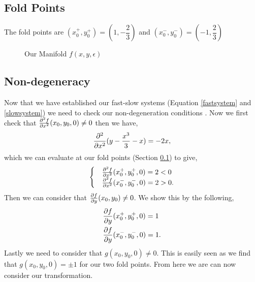 \subsection{Fold Points}\label{Fold Points}
The fold points are $(x_0^+,y_0^+)=(1,-\dfrac{2}{3})$ and $(x_0^-,y_0^-)=(-1,\dfrac{2}{3})$
\begin{figure}[h]
    \centering
    \caption{Our Manifold $f(x,y,\epsilon)$}
    \label{fig:my_label}
\end{figure}

\subsection{Non-degeneracy}
Now that we have established our fast-slow systems (Equation \ref{fastsystem} and \ref{slowsystem}) we need to check our non-degeneration conditions \citep{krupa2001}. 
Now we first check that $ \pd{^2f}{x^2}(x_0,y_0,0)\neq 0$ then we have,
\begin{equation}
    \pd{^2}{x^2}(y-\dfrac{x^3}{3}-x)=-2x,
\end{equation}
which we can evaluate at our fold points (Section \ref{Fold Points}) to give,
\begin{equation} 
    \begin{cases}
            &\pd[2]{f}{x}(x_0^+,y_0^+,0)=2<0\\
            &\pd[2]{f}{x}(x_0^-,y_0^-,0)=2>0.
    \end{cases}
\end{equation}
Then we can consider that $\pd{f}{y}(x_0,y_0)\neq 0$. We show this by the following,
\begin{align}
        &\pd{f}{y}(x_0^+,y_0^+,0)=1\\
        &\pd{f}{y}(x_0^-,y_0^-,0)=1.
\end{align}
Lastly we need to consider that $g(x_0,y_0,0)\neq 0$. This is easily seen as we find that $g(x_0,y_0,0)=\pm 1$ for our two fold points. From here we are can now consider our transformation.